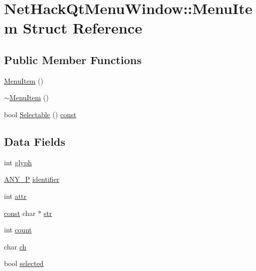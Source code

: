 \hypertarget{structNetHackQtMenuWindow_1_1MenuItem}{\section{Net\+Hack\+Qt\+Menu\+Window\+:\+:Menu\+Item Struct Reference}
\label{structNetHackQtMenuWindow_1_1MenuItem}
}
\subsection*{Public Member Functions}
\begin{DoxyCompactItemize}
\item 
\hyperlink{structNetHackQtMenuWindow_1_1MenuItem_a3d66c0f789e81eedccbcf28dec023886}{Menu\+Item} ()
\item 
\hyperlink{structNetHackQtMenuWindow_1_1MenuItem_a43d61ed96e98b1fde943de21b2f1e8af}{$\sim$\+Menu\+Item} ()
\item 
bool \hyperlink{structNetHackQtMenuWindow_1_1MenuItem_a61f051fe7e7a07d27feaca55fabe31b4}{Selectable} () \hyperlink{tradstdc_8h_a2c212835823e3c54a8ab6d95c652660e}{const} 
\end{DoxyCompactItemize}
\subsection*{Data Fields}
\begin{DoxyCompactItemize}
\item 
int \hyperlink{structNetHackQtMenuWindow_1_1MenuItem_a180471653f7d74e63ab3ec577ee8835f}{glyph}
\item 
\hyperlink{wintype_8h_ae29f750de92b8a7c2566957e5863fbed}{A\+N\+Y\+\_\+\+P} \hyperlink{structNetHackQtMenuWindow_1_1MenuItem_a602690fd0f3de764caa2290157de153a}{identifier}
\item 
int \hyperlink{structNetHackQtMenuWindow_1_1MenuItem_aa91fb587b49e65f8fd93d5c9029e5ad4}{attr}
\item 
\hyperlink{tradstdc_8h_a2c212835823e3c54a8ab6d95c652660e}{const} char $\ast$ \hyperlink{structNetHackQtMenuWindow_1_1MenuItem_a122dd4ed13fcba6c753c0fce67912581}{str}
\item 
int \hyperlink{structNetHackQtMenuWindow_1_1MenuItem_a75c190195c82577dd1309c3f324fd82b}{count}
\item 
char \hyperlink{structNetHackQtMenuWindow_1_1MenuItem_a174aaa4f6e4e7bb6dea4c0e697bc97e6}{ch}
\item 
bool \hyperlink{structNetHackQtMenuWindow_1_1MenuItem_abe7d4512f8370e59f139834f82e4ed74}{selected}
\end{DoxyCompactItemize}



